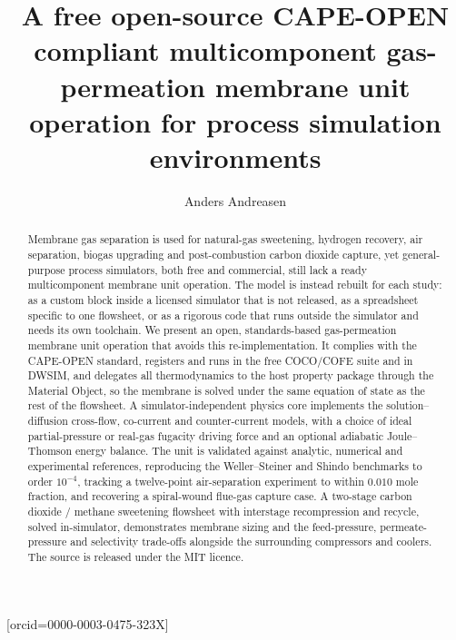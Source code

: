 \documentclass[a4paper,fleqn]{cas-dc}
\begin{document}
\let\WriteBookmarks\relax
\def\floatpagepagefraction{1}
\def\textpagefraction{.001}


\title[mode=title]{A free open-source CAPE-OPEN compliant multicomponent gas-permeation membrane unit operation for process simulation environments}

\author[1]{Anders Andreasen}[orcid=0000-0003-0475-323X]
\cormark[1]



\begin{abstract}
Membrane gas separation is used for natural-gas sweetening, hydrogen
recovery, air separation, biogas upgrading and post-combustion carbon
dioxide capture, yet general-purpose process simulators, both free and
commercial, still lack a ready multicomponent membrane unit operation. The
model is instead rebuilt for each study: as a custom block inside a licensed
simulator that is not released, as a spreadsheet specific to one flowsheet,
or as a rigorous code that runs outside the simulator and needs its own
toolchain. We present an open, standards-based gas-permeation membrane unit
operation that avoids this re-implementation. It complies with the CAPE-OPEN
standard, registers and runs in the free COCO/COFE suite and in DWSIM, and
delegates all thermodynamics to the
host property package through the Material Object, so the membrane is solved
under the same equation of state as the rest of the flowsheet. A
simulator-independent physics core implements the solution--diffusion
cross-flow, co-current and counter-current models, with a choice of ideal
partial-pressure or real-gas fugacity driving force and an optional adiabatic
Joule--Thomson energy balance. The unit is validated against analytic,
numerical and experimental references, reproducing the Weller--Steiner and
Shindo benchmarks to order $10^{-4}$, tracking a twelve-point air-separation
experiment to within $0.010$ mole fraction, and recovering a spiral-wound
flue-gas capture case. A two-stage carbon dioxide / methane sweetening
flowsheet with interstage recompression and recycle, solved in-simulator,
demonstrates membrane sizing and the feed-pressure, permeate-pressure and
selectivity trade-offs alongside the surrounding compressors and coolers.
The source is released under the MIT licence.
\end{abstract}
\end{document}
